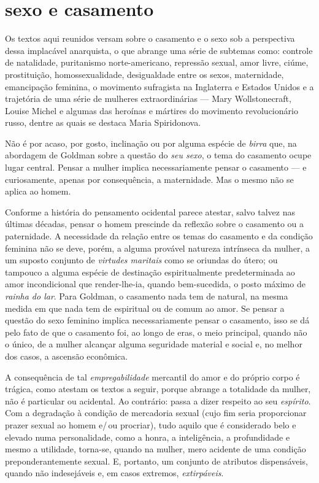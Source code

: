 \section{sexo e casamento}

Os textos aqui reunidos versam sobre o casamento e o sexo
sob a perspectiva dessa implacável anarquista, o que abrange uma série
de subtemas como: controle de natalidade, puritanismo
norte-americano, repressão sexual, amor livre, ciúme,
prostituição, homossexualidade, desigualdade entre os sexos,
maternidade, emancipação feminina, o movimento sufragista na
Inglaterra e Estados Unidos e a trajetória de uma série de mulheres
extraordinárias --- Mary Wollstonecraft, Louise Michel e algumas das
heroínas e mártires do movimento revolucionário russo, dentre as quais
se destaca Maria Spiridonova.

Não é por acaso, por gosto, inclinação ou por alguma espécie de
\textit{birra} que, na abordagem de Goldman sobre a questão do \textit{seu sexo},
o tema do casamento ocupe lugar central. Pensar a mulher implica
necessariamente pensar o casamento --- e curiosamente, apenas por
consequência, a maternidade.
Mas o mesmo não se aplica ao homem.

Conforme a história do pensamento ocidental parece atestar,
salvo talvez nas últimas décadas, pensar o homem prescinde da
reflexão sobre o casamento ou a paternidade. A necessidade da
relação entre os temas do casamento e da condição feminina não se deve,
porém, a alguma provável natureza intrínseca da mulher, a um suposto
conjunto de \textit{virtudes maritais} como se oriundas do útero; ou tampouco
a alguma espécie de destinação espiritualmente predeterminada ao amor
incondicional que render-lhe-ia, quando bem-sucedida, o posto máximo de
\textit{rainha do lar}. Para Goldman, o casamento nada tem de natural, na
mesma medida em que nada tem de espiritual ou de comum ao amor. Se
pensar a questão do sexo feminino implica necessariamente pensar o
casamento, isso se dá pelo fato de que o casamento foi, ao longo de
eras, o meio principal, quando não o único, de a mulher alcançar alguma
seguridade material e social e, no melhor dos casos, a
ascensão econômica.

A consequência de tal \textit{empregabilidade} mercantil do amor e do próprio
corpo é trágica, como atestam os textos a seguir, porque abrange
a totalidade da mulher, não é particular ou acidental.
Ao contrário: passa a dizer respeito ao seu
\textit{espírito}. Com a degradação à condição de mercadoria sexual (cujo
fim seria proporcionar prazer sexual ao homem e/\,ou procriar),
tudo aquilo que é considerado belo e elevado numa personalidade, como a
honra, a inteligência, a profundidade e mesmo a utilidade, torna-se,
quando na mulher, mero acidente de uma condição
preponderantemente sexual. E, portanto, um conjunto de atributos
dispensáveis, quando não indesejáveis e, em casos extremos,
\textit{extirpáveis}.

